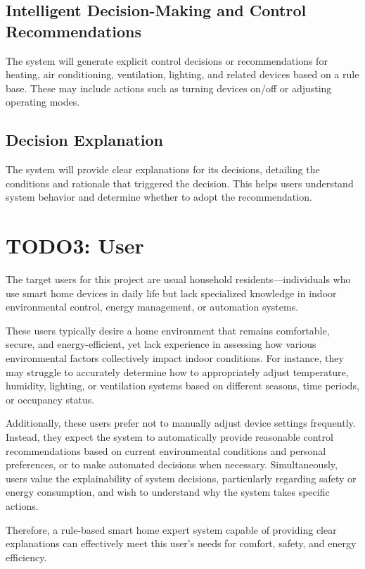 \documentclass{article}
\begin{document}
\subsection{Intelligent Decision-Making and Control Recommendations}

The system will generate explicit control decisions or recommendations for heating, air conditioning, ventilation, lighting, and related devices based on a rule base. These may include actions such as turning devices on/off or adjusting operating modes.

\subsection{Decision Explanation}

The system will provide clear explanations for its decisions, detailing the conditions and rationale that triggered the decision. This helps users understand system behavior and determine whether to adopt the recommendation.

\section{TODO3: User}

The target users for this project are usual household residents—individuals who use smart home devices in daily life but lack specialized knowledge in indoor environmental control, energy management, or automation systems.

These users typically desire a home environment that remains comfortable, secure, and energy-efficient, yet lack experience in assessing how various environmental factors collectively impact indoor conditions. For instance, they may struggle to accurately determine how to appropriately adjust temperature, humidity, lighting, or ventilation systems based on different seasons, time periods, or occupancy status.

Additionally, these users prefer not to manually adjust device settings frequently. Instead, they expect the system to automatically provide reasonable control recommendations based on current environmental conditions and personal preferences, or to make automated decisions when necessary. Simultaneously, users value the explainability of system decisions, particularly regarding safety or energy consumption, and wish to understand why the system takes specific actions.

Therefore, a rule-based smart home expert system capable of providing clear explanations can effectively meet this user's needs for comfort, safety, and energy efficiency.
\end{document}
